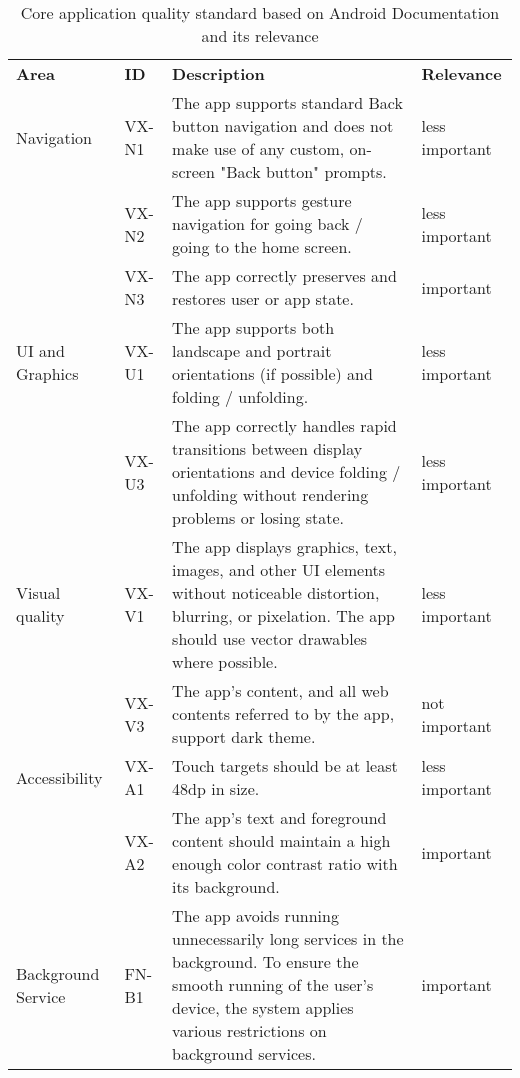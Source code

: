 
\begin{longtable}{p{} p{} p{} p{}}
    \label{tab:qualitystandard}\\

    \caption{Core application quality standard based on Android Documentation \autocite{androidqualityguidelines} and its relevance}\\

        \hline
        \textbf{Area} & \textbf{ID} & \textbf{Description} & \textbf{Relevance} \\
        \hline
        Navigation & VX-N1 & The app supports standard Back button navigation and does not make use of any custom, on-screen "Back button" prompts. & less important \\
         & VX-N2 & The app supports gesture navigation for going back / going to the home screen. & less important \\
         & VX-N3 & The app correctly preserves and restores user or app state. & important \\
  
        UI and Graphics & VX-U1 & The app supports both landscape and portrait orientations (if possible) and folding / unfolding. & less important \\
         & VX-U3 & The app correctly handles rapid transitions between display orientations and device folding / unfolding without rendering problems or losing state. & less important \\
  
        Visual quality & VX-V1 & The app displays graphics, text, images, and other UI elements without noticeable distortion, blurring, or pixelation. The app should use vector drawables where possible. & less important \\
         & VX-V3 & The app's content, and all web contents referred to by the app, support dark theme. & not important \\
        
        Accessibility & VX-A1 & Touch targets should be at least 48dp in size. & less important \\
         & VX-A2 & The app's text and foreground content should maintain a high enough color contrast ratio with its background. & important \\
  
        Background Service & FN-B1 & The app avoids running unnecessarily long services in the background. To ensure the smooth running of the user's device, the system applies various restrictions on background services. & important\\


\end{longtable}
